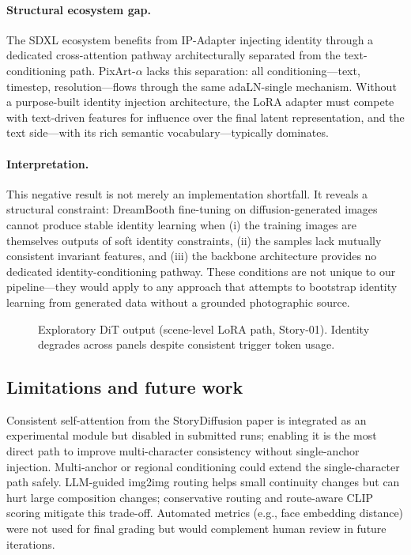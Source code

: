 \paragraph{Structural ecosystem gap.}

The SDXL ecosystem benefits from IP-Adapter injecting identity through a dedicated cross-attention pathway architecturally separated from the text-conditioning path. PixArt-$\alpha$ lacks this separation: all conditioning---text, timestep, resolution---flows through the same adaLN-single mechanism. Without a purpose-built identity injection architecture, the LoRA adapter must compete with text-driven features for influence over the final latent representation, and the text side---with its rich semantic vocabulary---typically dominates.

\paragraph{Interpretation.}

This negative result is not merely an implementation shortfall. It reveals a structural constraint: DreamBooth fine-tuning on diffusion-generated images cannot produce stable identity learning when (i) the training images are themselves outputs of soft identity constraints, (ii) the samples lack mutually consistent invariant features, and (iii) the backbone architecture provides no dedicated identity-conditioning pathway. These conditions are not unique to our pipeline---they would apply to any approach that attempts to bootstrap identity learning from generated data without a grounded photographic source.

\begin{figure}[!t]
  \centering
  \caption{Exploratory DiT output (scene-level LoRA path, Story-01). Identity degrades across panels despite consistent trigger token usage.}
  \label{fig:dit_panels}
\end{figure}

\subsection{Limitations and future work}
Consistent self-attention from the StoryDiffusion paper is integrated as an experimental module but disabled in submitted runs; enabling it is the most direct path to improve multi-character consistency without single-anchor injection.
Multi-anchor or regional conditioning could extend the single-character path safely.
LLM-guided img2img routing helps small continuity changes but can hurt large composition changes; conservative routing and route-aware CLIP scoring mitigate this trade-off.
Automated metrics (e.g., face embedding distance) were not used for final grading but would complement human review in future iterations.
